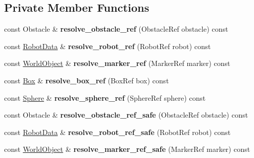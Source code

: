 \subsection*{Private Member Functions}
\begin{CompactItemize}
\item 
\hypertarget{class_view_26da087403dfa4e35dcb782209e5b452}{
const Obstacle \& \textbf{resolve\_\-obstacle\_\-ref} (ObstacleRef obstacle) const }
\label{class_view_26da087403dfa4e35dcb782209e5b452}

\item 
\hypertarget{class_view_ea0e2f72b7d61e193b8535ffbd31a55a}{
const \hyperlink{class_robot_data}{RobotData} \& \textbf{resolve\_\-robot\_\-ref} (RobotRef robot) const }
\label{class_view_ea0e2f72b7d61e193b8535ffbd31a55a}

\item 
\hypertarget{class_view_d4baccf339e1f80a5ea51c38fd43a1ca}{
const \hyperlink{class_world_object}{WorldObject} \& \textbf{resolve\_\-marker\_\-ref} (MarkerRef marker) const }
\label{class_view_d4baccf339e1f80a5ea51c38fd43a1ca}

\item 
\hypertarget{class_view_c36b06dfedbf8e0b411f0e9f411bca9e}{
const \hyperlink{class_box}{Box} \& \textbf{resolve\_\-box\_\-ref} (BoxRef box) const }
\label{class_view_c36b06dfedbf8e0b411f0e9f411bca9e}

\item 
\hypertarget{class_view_4b2586808a208a032133826f6d958765}{
const \hyperlink{class_sphere}{Sphere} \& \textbf{resolve\_\-sphere\_\-ref} (SphereRef sphere) const }
\label{class_view_4b2586808a208a032133826f6d958765}

\item 
\hypertarget{class_view_59d1a4d60b56c682fd791e89d65ce6bb}{
const Obstacle \& \textbf{resolve\_\-obstacle\_\-ref\_\-safe} (ObstacleRef obstacle) const }
\label{class_view_59d1a4d60b56c682fd791e89d65ce6bb}

\item 
\hypertarget{class_view_82439df63b460f9d1eb098b3f5bcba4f}{
const \hyperlink{class_robot_data}{RobotData} \& \textbf{resolve\_\-robot\_\-ref\_\-safe} (RobotRef robot) const }
\label{class_view_82439df63b460f9d1eb098b3f5bcba4f}

\item 
\hypertarget{class_view_6fe4251a36f7df350f312fd19033812c}{
const \hyperlink{class_world_object}{WorldObject} \& \textbf{resolve\_\-marker\_\-ref\_\-safe} (MarkerRef marker) const }
\label{class_view_6fe4251a36f7df350f312fd19033812c}


\end{CompactItemize}
